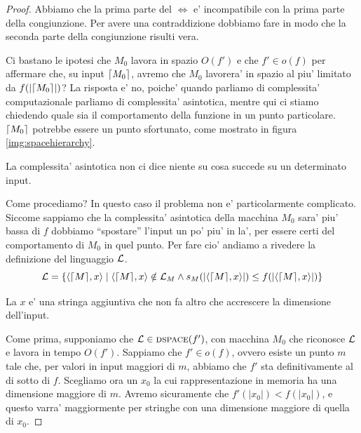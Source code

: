 \begin{proof}
    Abbiamo che la prima parte del $\iff$ e' incompatibile con la prima parte della congiunzione.
    Per avere una contraddizione dobbiamo fare in modo che la seconda parte della congiunzione
    risulti vera.

    Ci bastano le ipotesi che $M_{0}$ lavora in spazio $O(f')$ e che $f' \in o(f)$ per affermare
    che, su input $\lceil M_{0} \rceil$, avremo che $M_{0}$ lavorera' in spazio al piu' limitato da
    $f(|\lceil M_{0} \rceil|)$? La risposta e' no, poiche' quando parliamo di complessita' computazionale
    parliamo di complessita' asintotica, mentre qui ci stiamo chiedendo quale sia il comportamento
    della funzione in un punto particolare. $\lceil M_{0} \rceil$ potrebbe essere un punto sfortunato, come
    mostrato in figura \ref{img:spacehierarchy}.

    La complessita' asintotica non ci dice niente su cosa succede su un determinato input.

    Come procediamo? In questo caso il problema non e' particolarmente complicato. Siccome sappiamo
    che la complessita' asintotica della macchina $M_{0}$ sara' piu' bassa di $f$ dobbiamo
    ``spostare'' l'input un po' piu' in la', per essere certi del comportamento di $M_{0}$ in quel
    punto. Per fare cio' andiamo a rivedere la definizione del linguaggio $\mathcal{L}$.
    \begin{equation*}
        \mathcal{L} = \{\langle \lceil M \rceil, x \rangle \mid \langle \lceil M \rceil, x \rangle \notin \mathcal{L}_{M} \land
        s_{M}(|\langle \lceil M \rceil, x \rangle|) \leq f(|\langle \lceil M \rceil, x \rangle|)\}
    \end{equation*}

    La $x$ e' una stringa aggiuntiva che non fa altro che accrescere la dimensione dell'input.

    Come prima, supponiamo che $\mathcal{L} \in \textsc{dspace}(f')$, con macchina $M_{0}$ che riconosce $\mathcal{L}$ e
    lavora in tempo $O(f')$. Sappiamo che $f' \in o(f)$, ovvero esiste un punto $m$ tale che, per
    valori in input maggiori di $m$, abbiamo che $f'$ sta definitivamente al di sotto di $f$.
    Scegliamo ora un $x_{0}$ la cui rappresentazione in memoria ha una dimensione maggiore di $m$.
    Avremo sicuramente che $f'(|x_{0}|) < f(|x_{0}|)$, e questo varra' maggiormente per stringhe con
    una dimensione maggiore di quella di $x_{0}$.


\end{proof}
